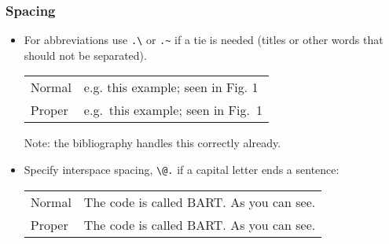 \documentclass[10pt, letter]{article}
\begin{document}
\begin{multicols}{2}
\subsubsection*{Spacing}
\begin{itemize}
\item For abbreviations use \verb|.\| or \verb|.~| if a tie is needed
  (titles or other words that should not be separated).
  \begin{center}
    \begin{tabular}[h!]{ll}
      Normal & e.g. this example; seen in Fig. 1 \\
      Proper & e.g.\ this example; seen in Fig.~1
    \end{tabular}
  \end{center}
  Note: the bibliography handles this correctly already.
\item Specify interspace spacing, \verb|\@.| if a capital letter ends
  a sentence:
    \begin{center}
    \begin{tabular}[h!]{ll} 
      Normal & The code is called BART. As you can see. \\
      Proper & The code is called BART\@. As you can see.
    \end{tabular}
  \end{center}
\end{itemize}  

\end{multicols}
\end{document}
